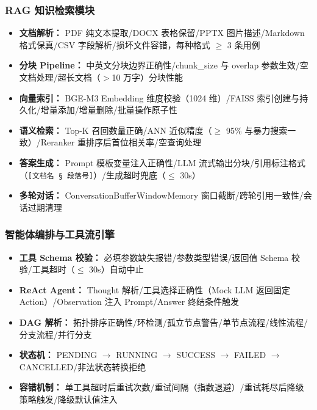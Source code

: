 \documentclass[a4paper,zihao=-4]{ctexart}
\begin{document}
\subsubsection{RAG 知识检索模块}

\begin{itemize}
  \item \textbf{文档解析：} PDF 纯文本提取/DOCX 表格保留/PPTX 图片描述/Markdown 格式保真/CSV
        字段解析/损坏文件容错，每种格式 $\geq$ 3 条用例
  \item \textbf{分块 Pipeline：} 中英文分块边界正确性/chunk\_size 与 overlap
        参数生效/空文档处理/超长文档（$>$10 万字）分块性能
  \item \textbf{向量索引：} BGE-M3 Embedding 维度校验（1024 维）/FAISS
        索引创建与持久化/增量添加/增量删除/批量操作原子性
  \item \textbf{语义检索：} Top-K 召回数量正确/ANN 近似精度（$\geq$ 95\% 与暴力搜索一致）/Reranker
        重排序后首位相关率/空查询处理
  \item \textbf{答案生成：} Prompt 模板变量注入正确性/LLM 流式输出分块/引用标注格式（\texttt{[文档名 §
              段落号]}）/生成超时兜底（$\leq$ 30s）
  \item \textbf{多轮对话：} ConversationBufferWindowMemory 窗口截断/跨轮引用一致性/会话过期清理
\end{itemize}

\subsubsection{智能体编排与工具流引擎}

\begin{itemize}
  \item \textbf{工具 Schema 校验：} 必填参数缺失报错/参数类型错误/返回值 Schema 校验/工具超时（$\leq$
        30s）自动中止
  \item \textbf{ReAct Agent：} Thought 解析/工具选择正确性（Mock LLM 返回固定
        Action）/Observation 注入 Prompt/Answer 终结条件触发
  \item \textbf{DAG 解析：} 拓扑排序正确性/环检测/孤立节点警告/单节点流程/线性流程/分支流程/并行分支
  \item \textbf{状态机：} PENDING $\to$ RUNNING  $\to$
        SUCCESS
        $\to$ FAILED $\to$ CANCELLED/非法状态转换拒绝
  \item \textbf{容错机制：} 单工具超时后重试次数/重试间隔（指数退避）/重试耗尽后降级策略触发/降级默认值注入
\end{itemize}
\end{document}

